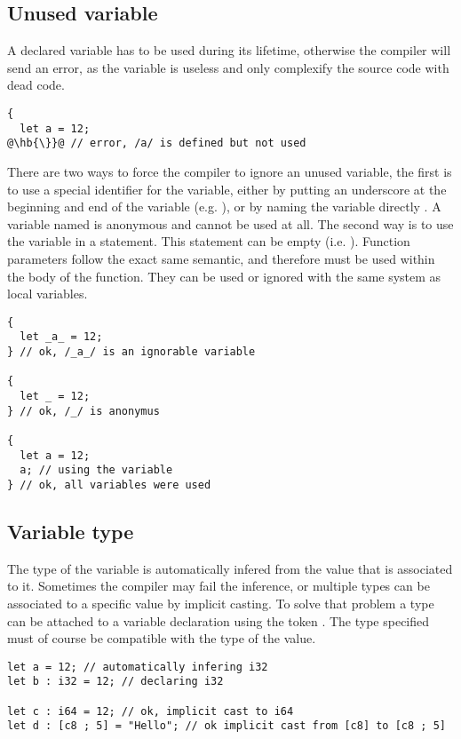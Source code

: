 \subsection{Unused variable}
\label{sec:unused_variables}

A declared variable has to be used during its lifetime, otherwise the compiler
will send an error, as the variable is useless and only complexify the source
code with dead code.

\begin{lstlisting}[style=coloredverbatim, escapechar=@]
{
  let a = 12;
@\hb{\}}@ // error, /a/ is defined but not used
\end{lstlisting}

There are two ways to force the compiler to ignore an unused variable, the first
is to use a special identifier for the variable, either by putting an underscore
at the beginning and end of the variable (e.g. ), or by naming the
variable directly \token{\_}. A variable named \token{\_} is anonymous and
cannot be used at all. The second way is to use the variable in a statement.
This statement can be empty (i.e. ). Function parameters follow the
exact same semantic, and therefore must be used within the body of the function.
They can be used or ignored with the same system as local variables.

\begin{lstlisting}[style=coloredverbatim, escapechar=@]
{
  let _a_ = 12;
} // ok, /_a_/ is an ignorable variable

{
  let _ = 12;
} // ok, /_/ is anonymus

{
  let a = 12;
  a; // using the variable
} // ok, all variables were used
\end{lstlisting}

\subsection{Variable type}

The type of the variable is automatically infered from the value that is
associated to it. Sometimes the compiler may fail the inference, or multiple
types can be associated to a specific value by implicit casting. To solve that
problem a type can be attached to a variable declaration using the token
\token{:}. The type specified must of course be compatible with the type of the
value.

\begin{lstlisting}[style=coloredverbatim, escapechar=@]
let a = 12; // automatically infering i32
let b : i32 = 12; // declaring i32

let c : i64 = 12; // ok, implicit cast to i64
let d : [c8 ; 5] = "Hello"; // ok implicit cast from [c8] to [c8 ; 5]
\end{lstlisting}

